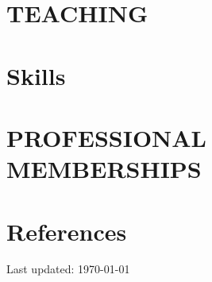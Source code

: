\documentclass{prometheus_cv}
\begin{document}
\section{TEACHING}


\section{Skills}


\section{PROFESSIONAL MEMBERSHIPS}


\section{References}






\begin{center}
  \begin{footnotesize}
    Last updated: \today \\
  \end{footnotesize}
\end{center}
\end{document}
